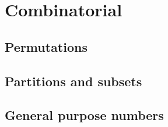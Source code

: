 
\chapter{Combinatorial}

\section{Permutations}

\section{Partitions and subsets}

\section{General purpose numbers}

